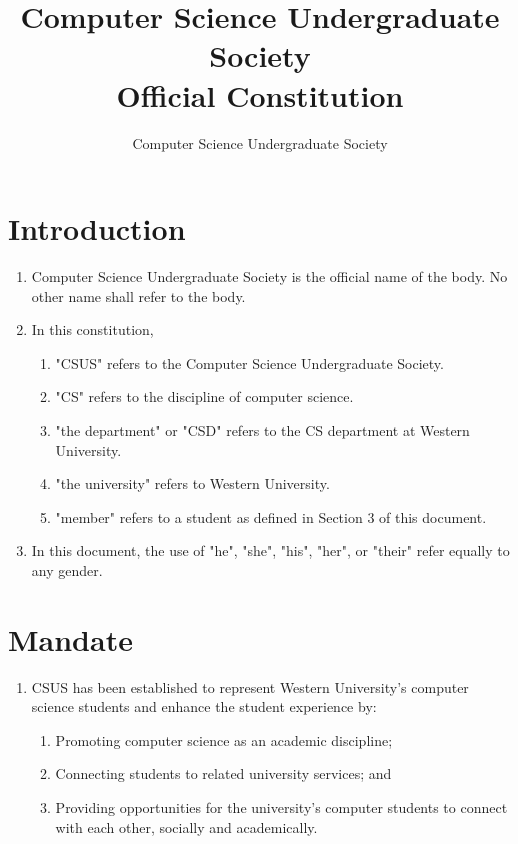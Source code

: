 \documentclass{article}
\title{Computer Science Undergraduate Society\\Official Constitution}
\author{Computer Science Undergraduate Society}
\date{\monthname[\the\month] \the\year}
\begin{document}
\begin{titlepage}
\maketitle
\end{titlepage}

\tableofcontents
\newpage

\section{Introduction}
\begin{enumerate}
	\item Computer Science Undergraduate Society is the official name of the body. No other name shall refer to the body.
	\item In this constitution,
	\begin{enumerate}
		\item "CSUS" refers to the Computer Science Undergraduate Society.
		\item "CS" refers to the discipline of computer science.
		\item "the department" or "CSD" refers to the CS department at Western University.
		\item "the university" refers to Western University.
		\item "member" refers to a student as defined in Section 3 of this document.
	\end{enumerate}
	\item In this document, the use of "he", "she", "his", "her", or "their" refer equally to any gender.
\end{enumerate}

\section{Mandate}
\begin{enumerate}
	\item CSUS has been established to represent Western University's computer science students and enhance the student experience by:
	\begin{enumerate}
		\item Promoting computer science as an academic discipline;
		\item Connecting students to related university services; and
		\item Providing opportunities for the university's computer students to connect with each other, socially and academically.
	\end{enumerate}
\end{enumerate}
\end{document}

